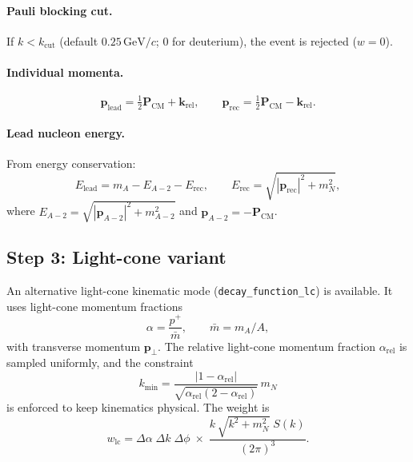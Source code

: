 \documentclass[11pt,a4paper]{article}
\newcommand{\vect}[1]{\bm{#1}}
\newcommand{\unit}[1]{\,\mathrm{#1}}
\newcommand{\GeV}{\unit{GeV}}
\begin{document}
\paragraph{Pauli blocking cut.}
If $k < k_{\text{cut}}$ (default $0.25\GeV/c$; $0$ for deuterium),
the event is rejected ($w = 0$).

\paragraph{Individual momenta.}
\begin{equation}
  \vect{p}_{\text{lead}} = \tfrac{1}{2}\vect{P}_{\text{CM}} + \vect{k}_{\text{rel}},
  \qquad
  \vect{p}_{\text{rec}}  = \tfrac{1}{2}\vect{P}_{\text{CM}} - \vect{k}_{\text{rel}}.
\end{equation}

\paragraph{Lead nucleon energy.}
From energy conservation:
\begin{equation}
  E_{\text{lead}} = m_{A} - E_{A{-}2} - E_{\text{rec}},
  \qquad
  E_{\text{rec}} = \sqrt{|\vect{p}_{\text{rec}}|^{2} + m_{N}^{2}},
\end{equation}
where $E_{A{-}2} = \sqrt{|\vect{p}_{A{-}2}|^{2} + m_{A{-}2}^{2}}$ and
$\vect{p}_{A{-}2} = -\vect{P}_{\text{CM}}$.

\subsection{Step 3: Light-cone variant}

An alternative light-cone kinematic mode (\texttt{decay\_function\_lc}) is
available.  It uses light-cone momentum fractions
\begin{equation}
  \alpha = \frac{p^{+}}{\bar{m}}, \qquad
  \bar{m} = m_{A}/A,
\end{equation}
with transverse momentum $\vect{p}_{\perp}$.  The relative light-cone
momentum fraction $\alpha_{\text{rel}}$ is sampled uniformly, and the
constraint
\begin{equation}
  k_{\min} = \frac{|1 - \alpha_{\text{rel}}|}
                  {\sqrt{\alpha_{\text{rel}}(2-\alpha_{\text{rel}})}}\,m_{N}
\end{equation}
is enforced to keep kinematics physical.  The weight is
\begin{equation}
  w_{\text{lc}}
  = \Delta\alpha\;\Delta k\;\Delta\phi
    \;\times\;
    \frac{k\,\sqrt{k^{2}+m_{N}^{2}}\;S(k)}{(2\pi)^{3}}.
\end{equation}
\end{document}
